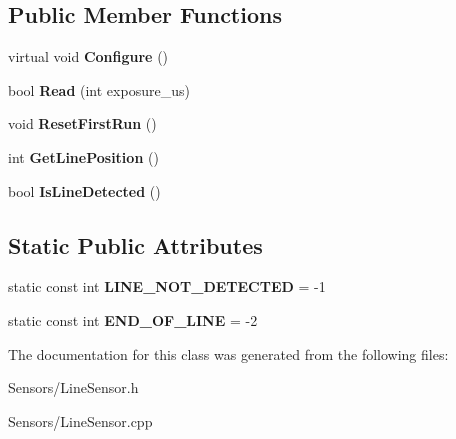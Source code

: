 \subsection*{\-Public \-Member \-Functions}
\begin{DoxyCompactItemize}
\item 
\hypertarget{class_line_sensor_a8005f7b443337c70ad731adc28a249f4}{
virtual void {\bfseries \-Configure} ()}
\label{class_line_sensor_a8005f7b443337c70ad731adc28a249f4}

\item 
\hypertarget{class_line_sensor_a18019d78c0cfefa037de88c6abc0d988}{
bool {\bfseries \-Read} (int exposure\-\_\-us)}
\label{class_line_sensor_a18019d78c0cfefa037de88c6abc0d988}

\item 
\hypertarget{class_line_sensor_a7a61de8e8ff1cd814b0cc1c7f8a01795}{
void {\bfseries \-Reset\-First\-Run} ()}
\label{class_line_sensor_a7a61de8e8ff1cd814b0cc1c7f8a01795}

\item 
\hypertarget{class_line_sensor_a365fe0a43893c63994b69aa1eeca3e6e}{
int {\bfseries \-Get\-Line\-Position} ()}
\label{class_line_sensor_a365fe0a43893c63994b69aa1eeca3e6e}

\item 
\hypertarget{class_line_sensor_a6cb75555e1eb667072225182d3c73842}{
bool {\bfseries \-Is\-Line\-Detected} ()}
\label{class_line_sensor_a6cb75555e1eb667072225182d3c73842}

\end{DoxyCompactItemize}
\subsection*{\-Static \-Public \-Attributes}
\begin{DoxyCompactItemize}
\item 
\hypertarget{class_line_sensor_a6113b1060280775c6d230fde3811b97d}{
static const int {\bfseries \-L\-I\-N\-E\-\_\-\-N\-O\-T\-\_\-\-D\-E\-T\-E\-C\-T\-E\-D} = -\/1}
\label{class_line_sensor_a6113b1060280775c6d230fde3811b97d}

\item 
\hypertarget{class_line_sensor_a79089008589a2472a20ea89ca90c20b5}{
static const int {\bfseries \-E\-N\-D\-\_\-\-O\-F\-\_\-\-L\-I\-N\-E} = -\/2}
\label{class_line_sensor_a79089008589a2472a20ea89ca90c20b5}

\end{DoxyCompactItemize}


\-The documentation for this class was generated from the following files\-:\begin{DoxyCompactItemize}
\item 
\-Sensors/\-Line\-Sensor.\-h\item 
\-Sensors/\-Line\-Sensor.\-cpp\end{DoxyCompactItemize}
